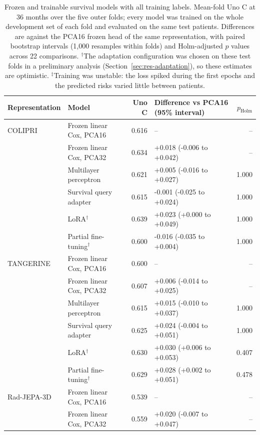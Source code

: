 \begin{table}[!htbp]
\centering\footnotesize
\caption{Frozen and trainable survival models with all training labels. Mean-fold Uno C at 36 months over the five outer folds; every model was trained on the whole development set of each fold and evaluated on the same test patients. Differences are against the PCA16 frozen head of the same representation, with paired bootstrap intervals (1,000 resamples within folds) and Holm-adjusted $p$ values across 22 comparisons. $^{\dagger}$The adaptation configuration was chosen on these test folds in a preliminary analysis (Section~\ref{sec:res-adaptation}), so these estimates are optimistic. $^{\ddagger}$Training was unstable: the loss spiked during the first epochs and the predicted risks varied little between patients.}
\label{tab:trainable_results}
\begin{tabular}{@{}llrlr@{}}
\toprule
Representation & Model & Uno C & Difference vs PCA16 (95\% interval) & $p_\mathrm{Holm}$ \\
\midrule
COLIPRI & Frozen linear Cox, PCA16 & 0.616 & -- & -- \\
 & Frozen linear Cox, PCA32 & 0.634 & +0.018 (-0.006 to +0.042) & -- \\
 & Multilayer perceptron & 0.621 & +0.005 (-0.016 to +0.027) & 1.000 \\
 & Survival query adapter & 0.615 & -0.001 (-0.025 to +0.024) & 1.000 \\
 & LoRA$^{\dagger}$ & 0.639 & +0.023 (+0.000 to +0.049) & 1.000 \\
 & Partial fine-tuning$^{\dagger}$ & 0.600 & -0.016 (-0.035 to +0.004) & 1.000 \\
\addlinespace
TANGERINE & Frozen linear Cox, PCA16 & 0.600 & -- & -- \\
 & Frozen linear Cox, PCA32 & 0.607 & +0.006 (-0.014 to +0.025) & -- \\
 & Multilayer perceptron & 0.615 & +0.015 (-0.010 to +0.037) & 1.000 \\
 & Survival query adapter & 0.625 & +0.024 (-0.004 to +0.051) & 1.000 \\
 & LoRA$^{\dagger}$ & 0.630 & +0.030 (+0.006 to +0.053) & 0.407 \\
 & Partial fine-tuning$^{\dagger}$ & 0.629 & +0.028 (+0.002 to +0.051) & 0.478 \\
\addlinespace
Rad-JEPA-3D & Frozen linear Cox, PCA16 & 0.539 & -- & -- \\
 & Frozen linear Cox, PCA32 & 0.559 & +0.020 (-0.007 to +0.047) & -- \\

\end{tabular}
\end{table}
